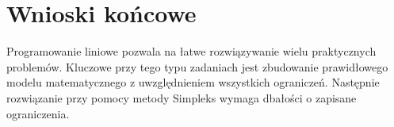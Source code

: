 \documentclass[a4paper,15pt]{article}
\begin{document}
\section{Wnioski końcowe}
Programowanie liniowe pozwala na łatwe rozwiązywanie wielu praktycznych problemów. Kluczowe przy tego typu zadaniach jest zbudowanie prawidłowego modelu matematycznego z uwzględnieniem wszystkich ograniczeń. Następnie rozwiązanie przy pomocy metody Simpleks wymaga dbałości o zapisane ograniczenia. 
  
\end{document}
